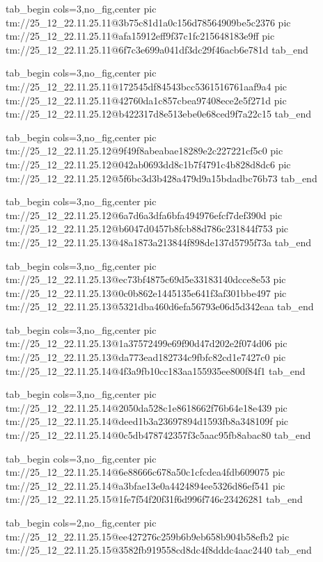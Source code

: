 \ifcmt
  tab_begin cols=3,no_fig,center
    pic tm://25_12_22.11.25.11@3b75c81d1a0c156d78564909be5c2376
    pic tm://25_12_22.11.25.11@afa15912eff9f37c1fc215648183e9ff
    pic tm://25_12_22.11.25.11@6f7c3e699a041df3dc29f46acb6e781d
  tab_end
\fi


\ifcmt
  tab_begin cols=3,no_fig,center
    pic tm://25_12_22.11.25.11@172545df84543bcc5361516761aaf9a4
    pic tm://25_12_22.11.25.11@42760da1c857cbea97408ece2e5f271d
    pic tm://25_12_22.11.25.12@b422317d8e513ebe0e68ced9f7a22c15
  tab_end
\fi


\ifcmt
  tab_begin cols=3,no_fig,center
    pic tm://25_12_22.11.25.12@9f49f8abeabae18289e2c227221cf5c0
    pic tm://25_12_22.11.25.12@042ab0693dd8c1b7f4791c4b828d8dc6
    pic tm://25_12_22.11.25.12@5f6bc3d3b428a479d9a15bdadbc76b73
  tab_end
\fi


\ifcmt
  tab_begin cols=3,no_fig,center
    pic tm://25_12_22.11.25.12@6a7d6a3dfa6bfa494976efcf7def390d
    pic tm://25_12_22.11.25.12@b6047d0457b8fcb88d786c231844f753
    pic tm://25_12_22.11.25.13@48a1873a213844f898de137d5795f73a
  tab_end
\fi


\ifcmt
  tab_begin cols=3,no_fig,center
    pic tm://25_12_22.11.25.13@ec73bf4875c69d5e33183140dcce8e53
    pic tm://25_12_22.11.25.13@0c0b862e1445135e641f3af301bbe497
    pic tm://25_12_22.11.25.13@5321dba460d6efa56793e06d5d342eaa
  tab_end
\fi


\ifcmt
  tab_begin cols=3,no_fig,center
    pic tm://25_12_22.11.25.13@1a37572499e69f90d47d202e2f074d06
    pic tm://25_12_22.11.25.13@da773ead182734c9fbfc82cd1e7427c0
    pic tm://25_12_22.11.25.14@4f3a9fb10cc183aa155935ee800f84f1
  tab_end
\fi


\ifcmt
  tab_begin cols=3,no_fig,center
    pic tm://25_12_22.11.25.14@2050da528c1e8618662f76b64e18e439
    pic tm://25_12_22.11.25.14@deed1b3a23697894d1593fb8a348109f
    pic tm://25_12_22.11.25.14@0c5db478742357f3c5aac95fb8abac80
  tab_end
\fi


\ifcmt
  tab_begin cols=3,no_fig,center
    pic tm://25_12_22.11.25.14@6e88666c678a50c1cfcdea4fdb609075
    pic tm://25_12_22.11.25.14@a3bfae13e0a4424894ee5326d86ef541
    pic tm://25_12_22.11.25.15@1fe7f54f20f31f6d996f746c23426281
  tab_end
\fi


\ifcmt
  tab_begin cols=2,no_fig,center
    pic tm://25_12_22.11.25.15@ee427276c259b6b9eb658b904b58efb2
    pic tm://25_12_22.11.25.15@3582fb919558cd8dc4f8dddc4aac2440
  tab_end
\fi

